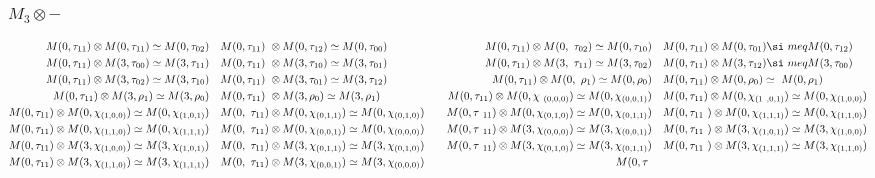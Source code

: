 \subsubsection{$M_3\otimes -$}
\begin{align*}
M(0,\tau_{11}) \otimes M(0,\tau_{11}) \simeq M(0,\tau_{02}) &&& M(0,\tau_{11})\
 \otimes M(0,\tau_{12}) \simeq M(0,\tau_{00}) &&& M(0,\tau_{11}) \otimes M(0,\
\tau_{02}) \simeq M(0,\tau_{10}) &&& M(0,\tau_{11}) \otimes M(0,\tau_{01}) \si\
meq M(0,\tau_{12})\\
M(0,\tau_{11}) \otimes M(3,\tau_{00}) \simeq M(3,\tau_{11}) &&& M(0,\tau_{11})\
 \otimes M(3,\tau_{10}) \simeq M(3,\tau_{01}) &&& M(0,\tau_{11}) \otimes M(3,\
\tau_{11}) \simeq M(3,\tau_{02}) &&& M(0,\tau_{11}) \otimes M(3,\tau_{12}) \si\
meq M(3,\tau_{00})\\
M(0,\tau_{11}) \otimes M(3,\tau_{02}) \simeq M(3,\tau_{10}) &&& M(0,\tau_{11})\
 \otimes M(3,\tau_{01}) \simeq M(3,\tau_{12}) &&& M(0,\tau_{11}) \otimes M(0,\
\rho_{1}) \simeq M(0,\rho_{0}) &&& M(0,\tau_{11}) \otimes M(0,\rho_{0}) \simeq\
 M(0,\rho_{1})\\
M(0,\tau_{11}) \otimes M(3,\rho_{1}) \simeq M(3,\rho_{0}) &&& M(0,\tau_{11}) \
\otimes M(3,\rho_{0}) \simeq M(3,\rho_{1}) &&& M(0,\tau_{11}) \otimes M(0,\chi\
_{(0,0,0)}) \simeq M(0,\chi_{(0,0,1)}) &&& M(0,\tau_{11}) \otimes M(0,\chi_{(1\
,0,1)}) \simeq M(0,\chi_{(1,0,0)})\\
M(0,\tau_{11}) \otimes M(0,\chi_{(1,0,0)}) \simeq M(0,\chi_{(1,0,1)}) &&& M(0,\
\tau_{11}) \otimes M(0,\chi_{(0,1,1)}) \simeq M(0,\chi_{(0,1,0)}) &&& M(0,\tau\
_{11}) \otimes M(0,\chi_{(0,1,0)}) \simeq M(0,\chi_{(0,1,1)}) &&& M(0,\tau_{11\
}) \otimes M(0,\chi_{(1,1,1)}) \simeq M(0,\chi_{(1,1,0)})\\
M(0,\tau_{11}) \otimes M(0,\chi_{(1,1,0)}) \simeq M(0,\chi_{(1,1,1)}) &&& M(0,\
\tau_{11}) \otimes M(0,\chi_{(0,0,1)}) \simeq M(0,\chi_{(0,0,0)}) &&& M(0,\tau\
_{11}) \otimes M(3,\chi_{(0,0,0)}) \simeq M(3,\chi_{(0,0,1)}) &&& M(0,\tau_{11\
}) \otimes M(3,\chi_{(1,0,1)}) \simeq M(3,\chi_{(1,0,0)})\\
M(0,\tau_{11}) \otimes M(3,\chi_{(1,0,0)}) \simeq M(3,\chi_{(1,0,1)}) &&& M(0,\
\tau_{11}) \otimes M(3,\chi_{(0,1,1)}) \simeq M(3,\chi_{(0,1,0)}) &&& M(0,\tau\
_{11}) \otimes M(3,\chi_{(0,1,0)}) \simeq M(3,\chi_{(0,1,1)}) &&& M(0,\tau_{11\
}) \otimes M(3,\chi_{(1,1,1)}) \simeq M(3,\chi_{(1,1,0)})\\
M(0,\tau_{11}) \otimes M(3,\chi_{(1,1,0)}) \simeq M(3,\chi_{(1,1,1)}) &&& M(0,\
\tau_{11}) \otimes M(3,\chi_{(0,0,1)}) \simeq M(3,\chi_{(0,0,0)}) &&& M(0,\tau\

\end{align*}
